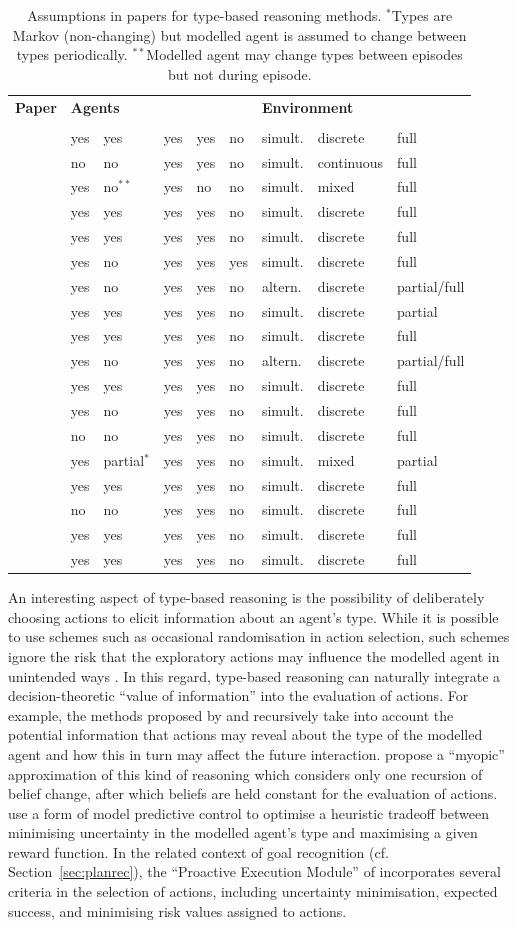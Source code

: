 \documentclass[final,1p,times,authoryear]{elsarticle}
\makeatletter
\newcommand{\nil}{@{}}
\newcommand{\nl}{\newline}
\newcommand{\rbox}[2]{\rotatebox{45}{\parbox{#1\textwidth}{#2}}}
\newcommand{\btab}{
	\center
	\scriptsize
	\bgroup\def\arraystretch{1.2}
	\begin{tabular}{\nil p{0.32\textwidth} @{\hspace{11pt}} l \nil l \nil l \nil l \nil l \nil l \nil l \nil l \nil}
		\toprule
		\bf Paper	& \multicolumn{5}{l}{\hspace{-5pt}\bf Agents} & \multicolumn{3}{l}{\hspace{-5pt}\bf Environment} \\[-5pt]
				& \rbox{0.075}{Stochastic \nl actions?} & \rbox{0.075}{Changing \nl behaviour?} & \rbox{0.075}{Factors \nl known?} & \rbox{0.07}{Independent \nl agents?} & \rbox{0.06}{Common \nl goals?} & \rbox{0.10}{Move order} & \rbox{0.11}{State/action \nl representation} & \rbox{0.09}{State/action \nl observability} \\
		\midrule}
\newcommand{\tabrow}[9]{\citep{#1} & #2 & #3 & #4 & #5 & #6 & #7 & #8 & #9 \\}
\newcommand{\etab}{
		\bottomrule
	\end{tabular}
	\egroup}
\newcommand{\si}{simult.}
\newcommand{\al}{altern.}
\newcommand{\as}{$^{*}$}
\newcommand{\ass}{$^{**}$}
\makeatother
\begin{document}
\begin{table}[t]
	\btab
		\tabrow{as2017}{yes}{yes}{yes}{yes}{no}{\si}{discrete}{full}
		\tabrow{sssd2016}{no}{no}{yes}{yes}{no}{\si}{continuous}{full}
		\tabrow{hbkd2016}{yes}{no\ass}{yes}{no}{no}{\si}{mixed}{full}
		\tabrow{acr2016aij,acr2015}{yes}{yes}{yes}{yes}{no}{\si}{discrete}{full}
		\tabrow{ar2014,ar2013}{yes}{yes}{yes}{yes}{no}{\si}{discrete}{full}
		\tabrow{bskr2013,bsk2011}{yes}{no}{yes}{yes}{yes}{\si}{discrete}{full}
		\tabrow{lcm2007}{yes}{no}{yes}{yes}{no}{\al}{discrete}{partial/full}
		\tabrow{gd2005}{yes}{yes}{yes}{yes}{no}{\si}{discrete}{partial}
		\tabrow{n2005}{yes}{yes}{yes}{yes}{no}{\si}{discrete}{full}
		\tabrow{sbl2005}{yes}{no}{yes}{yes}{no}{\al}{discrete}{partial/full}
		\tabrow{dfl2004}{yes}{yes}{yes}{yes}{no}{\si}{discrete}{full}
		\tabrow{cb2003}{yes}{no}{yes}{yes}{no}{\si}{discrete}{full}
		\tabrow{rw2003}{no}{no}{yes}{yes}{no}{\si}{discrete}{full}
		\tabrow{tea2002}{yes}{partial\as}{yes}{yes}{no}{\si}{mixed}{partial}
		\tabrow{fy2001}{yes}{yes}{yes}{yes}{no}{\si}{discrete}{full}
		\tabrow{cm1999}{no}{no}{yes}{yes}{no}{\si}{discrete}{full}
		\tabrow{n1998}{yes}{yes}{yes}{yes}{no}{\si}{discrete}{full}
		\tabrow{kl1993}{yes}{yes}{yes}{yes}{no}{\si}{discrete}{full}
	\etab
	\caption{Assumptions in papers for type-based reasoning methods. \as Types are Markov (non-changing) but modelled agent is assumed to change between types periodically. \ass Modelled agent may change types between episodes but not during episode.}
	\label{tab:typebased}
\end{table}

An interesting aspect of type-based reasoning is the possibility of deliberately choosing actions to elicit information about an agent's type. While it is possible to use schemes such as occasional randomisation in action selection, such schemes ignore the risk that the exploratory actions may influence the modelled agent in unintended ways \citep{cm1999}. In this regard, type-based reasoning can naturally integrate a decision-theoretic ``value of information'' \citep{h1966} into the evaluation of actions. For example, the methods proposed by \citet{cm1999} and \citet{acr2016aij} recursively take into account the potential information that actions may reveal about the type of the modelled agent and how this in turn may affect the future interaction. \citet{cb2003} propose a ``myopic'' approximation of this kind of reasoning which considers only one recursion of belief change, after which beliefs are held constant for the evaluation of actions. \citet{sssd2016} use a form of model predictive control to optimise a heuristic tradeoff between minimising uncertainty in the modelled agent's type and maximising a given reward function. In the related context of goal recognition (cf. Section~\ref{sec:planrec}), the ``Proactive Execution Module'' of \citet{sww2007} incorporates several criteria in the selection of actions, including uncertainty minimisation, expected success, and minimising risk values assigned to actions.
\end{document}
